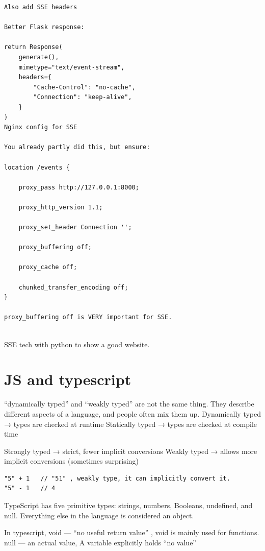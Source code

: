 \documentclass[paper=8.5in:11in, twoside, 12pt, pagesize=pdftex]{book}
\begin{document}
\begin{lstlisting}
Also add SSE headers

Better Flask response:

return Response(
    generate(),
    mimetype="text/event-stream",
    headers={
        "Cache-Control": "no-cache",
        "Connection": "keep-alive",
    }
)
Nginx config for SSE

You already partly did this, but ensure:

location /events {

    proxy_pass http://127.0.0.1:8000;

    proxy_http_version 1.1;

    proxy_set_header Connection '';

    proxy_buffering off;

    proxy_cache off;

    chunked_transfer_encoding off;
}

proxy_buffering off is VERY important for SSE.


\end{lstlisting}



SSE tech with python to show a good website. 

\section{JS and typescript}
“dynamically typed” and “weakly typed” are not the same thing. They describe different aspects of a language, and people often mix them up.
Dynamically typed → types are checked at runtime
Statically typed → types are checked at compile time

Strongly typed → strict, fewer implicit conversions
Weakly typed → allows more implicit conversions (sometimes surprising)

\begin{lstlisting}
"5" + 1   // "51" , weakly type, it can implicitly convert it. 
"5" - 1   // 4
\end{lstlisting}

\par TypeScript has five primitive types: strings, numbers, Booleans, undefined, and null. Everything else in the language is considered an object.

\par In typescript, void — “no useful return value” , void is mainly used for functions. null — an actual value, A variable explicitly holds “no value”

\par 
\end{document}

